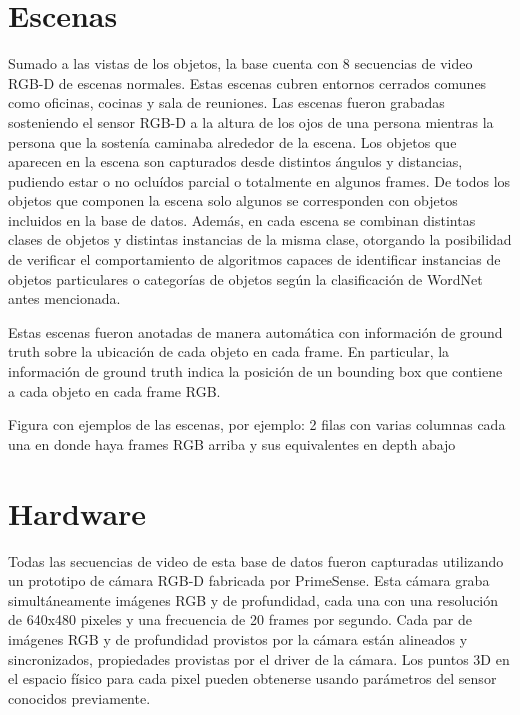 \section{Escenas}
Sumado a las vistas de los objetos, la base cuenta con 8 secuencias de video RGB-D de escenas normales. Estas escenas cubren entornos cerrados comunes como oficinas, cocinas y sala de reuniones. Las escenas fueron grabadas sosteniendo el sensor RGB-D a la altura de los ojos de una persona mientras la persona que la sostenía caminaba alrededor de la escena. Los objetos que aparecen en la escena son capturados desde distintos ángulos y distancias, pudiendo estar o no ocluídos parcial o totalmente en algunos frames. De todos los objetos que componen la escena solo algunos se corresponden con objetos incluidos en la base de datos. Además, en cada escena se combinan distintas clases de objetos y distintas instancias de la misma clase, otorgando la posibilidad de verificar el comportamiento de algoritmos capaces de identificar instancias de objetos particulares o categorías de objetos según la clasificación de WordNet antes mencionada.

Estas escenas fueron anotadas de manera automática con información de ground truth sobre la ubicación de cada objeto en cada frame. En particular, la información de ground truth indica la posición de un bounding box que contiene a cada objeto en cada frame RGB.

{\huge Figura con ejemplos de las escenas, por ejemplo: 2 filas con varias columnas cada una en donde haya frames RGB arriba y sus equivalentes en depth abajo}

\section{Hardware}
Todas las secuencias de video de esta base de datos fueron capturadas utilizando un prototipo de cámara RGB-D fabricada por PrimeSense. Esta cámara graba simultáneamente imágenes RGB y de profundidad, cada una con una resolución de 640x480 pixeles y una frecuencia de 20 frames por segundo. Cada par de imágenes RGB y de profundidad provistos por la cámara están alineados y sincronizados, propiedades provistas por el driver de la cámara. Los puntos 3D en el espacio físico para cada pixel pueden obtenerse usando parámetros del sensor conocidos previamente.
